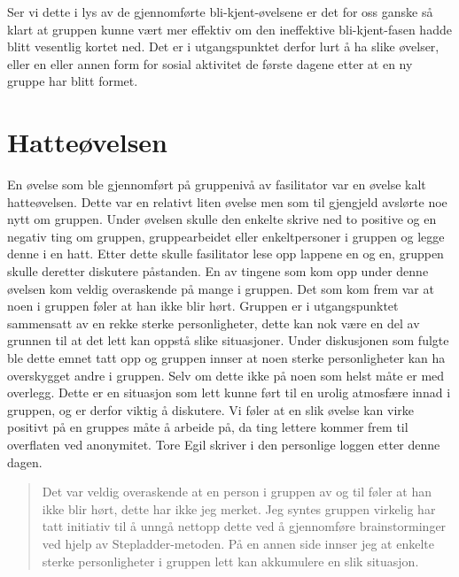 Ser vi dette i lys av de gjennomførte bli-kjent-øvelsene er det for oss ganske så klart at gruppen kunne vært mer effektiv om den ineffektive bli-kjent-fasen hadde blitt vesentlig kortet ned. 
Det er i utgangspunktet derfor lurt å ha slike øvelser, eller en eller annen form for sosial aktivitet de første dagene etter at en ny gruppe har blitt formet.

\section{Hatteøvelsen}
En øvelse som ble gjennomført på gruppenivå av fasilitator var en øvelse kalt hatteøvelsen. 
Dette var en relativt liten øvelse men som til gjengjeld avslørte noe nytt om gruppen. 
Under øvelsen skulle den enkelte skrive ned to positive og en negativ ting om gruppen, gruppearbeidet eller enkeltpersoner i gruppen og legge denne i en hatt. 
Etter dette skulle fasilitator lese opp lappene en og en, gruppen skulle deretter diskutere påstanden. 
En av tingene som kom opp under denne øvelsen kom veldig overaskende på mange i gruppen. 
Det som kom frem var at noen i gruppen føler at han ikke blir hørt. 
Gruppen er i utgangspunktet sammensatt av en rekke sterke personligheter, 
dette kan nok være en del av grunnen til at det lett kan oppstå slike situasjoner. 
Under diskusjonen som fulgte ble dette emnet tatt opp og gruppen innser at noen sterke personligheter kan ha overskygget andre i gruppen. 
Selv om dette ikke på noen som helst måte er med overlegg. 
Dette er en situasjon som lett kunne ført til en urolig atmosfære innad i gruppen, og er derfor viktig å diskutere. 
Vi føler at en slik øvelse kan virke positivt på en gruppes måte å arbeide på, da ting lettere kommer frem til overflaten ved anonymitet. 
Tore Egil skriver i den personlige loggen etter denne dagen.
\begin{quote}
Det var veldig overaskende at en person i gruppen av og til føler at han ikke blir hørt, dette har ikke jeg merket. 
Jeg syntes gruppen virkelig har tatt initiativ til å unngå nettopp dette ved å gjennomføre brainstorminger ved hjelp av Stepladder-metoden. 
På en annen side innser jeg at enkelte sterke personligheter i gruppen lett kan akkumulere en slik situasjon. 
\end{quote}


